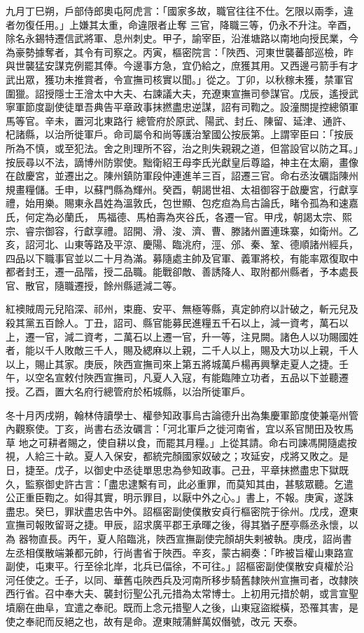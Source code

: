 \begin{pinyinscope}
 九月丁巳朔，戶部侍郎奧屯阿虎言：「國家多故，職官往往不仕。乞限以兩季，違者勿復任用。」上嫌其太重，命違限者止奪
 三官，降職三等，仍永不升注。辛酉，除名永錫特遷信武將軍、息州刺史。甲子，諭宰臣，沿淮塘路以南地向授民業，今為豪勢據奪者，其令有司察之。丙寅，樞密院言：「陜西、河東世襲蕃部巡檢，昨與世襲猛安謀克例罷其俸。今邊事方急，宜仍給之，庶獲其用。又西邊弓箭手有才武出眾，獲功未推賞者，令宣撫司核實以聞。」從之。丁卯，以秋稼未獲，禁軍官圍獵。詔授隱士王澮太中大夫、右諫議大夫，充遼東宣撫司參謀官。戊辰，遙授武寧軍節度副使徒單吾典告平章政事抹撚盡忠逆謀，詔有司鞫之。設潼關提控總領軍馬等官。辛未，置河北東路行
 總管府於原武、陽武、封丘、陳留、延津、通許、杞諸縣，以治所徙軍戶。命司屬令和尚等護治鞏國公按辰第。上謂宰臣曰：「按辰所為不慎，或至犯法。舍之則理所不容，治之則失親親之道，但當設官以防之耳。」按辰尋以不法，謫博州防禦使。黜衛紹王母李氏光獻皇后尊謚，神主在太廟，畫像在啟慶宮，並遷出之。陳州鎮防軍段仲連進羊三百，詔遷三官。命右丞汝礪詣陳州規畫糧儲。壬申，以蘇門縣為輝州。癸酉，朝謁世祖、太祖御容于啟慶宮，行獻享禮，始用樂。賜東永昌姓為溫敦氏，包世顯、包疙疸為烏古論氏，睹令孤為和速嘉氏，何定為必蘭氏，
 馬福德、馬柏壽為夾谷氏，各遷一官。甲戌，朝謁太宗、熙宗、睿宗御容，行獻享禮。詔開、滑、浚、濟、曹、滕諸州置連珠寨，如衛州。乙亥，詔河北、山東等路及平涼、慶陽、臨洮府，涇、邠、秦、鞏、德順諸州經兵，四品以下職事官並以二十月為滿。募隨處主帥及官軍、義軍將校，有能率眾復取中都者封王，遷一品階，授二品職。能戰卻敵、善誘降人、取附都州縣者，予本處長官、散官，隨職遷授，餘州縣遞減二等。



 紅襖賊周元兒陷深、祁州，束鹿、安平、無極等縣，真定帥府以計破之，斬元兒及殺其黨五百餘人。丁丑，詔司、縣官能募民進糧五千石以上，減一資考，萬石以
 上，遷一官，減二資考，二萬石以上遷一官，升一等，注見闕。諸色人以功賜國姓者，能以千人敗敵三千人，賜及緦麻以上親，二千人以上，賜及大功以上親，千人以上，賜止其家。庚辰，陜西宣撫司來上第五將城萬戶楊再興擊走夏人之捷。壬午，以空名宣敕付陜西宣撫司，凡夏人入寇，有能臨陣立功者，五品以下並聽遷授。乙酉，置大名府行總管府於柘城縣，以治所徙軍戶。



 冬十月丙戌朔，翰林侍讀學士、權參知政事烏古論德升出為集慶軍節度使兼亳州管內觀察使。丁亥，尚書右丞汝礪言：「河北軍戶之徙河南省，宜以系官閒田及牧馬草
 地之可耕者賜之，使自耕以食，而罷其月糧。」上從其請。命右司諫馮開隨處按視，人給三十畝。夏人入保安，都統完顏國家奴破之；攻延安，戍將又敗之。是日，捷至。戊子，以御史中丞徒單思忠為參知政事。己丑，平章抹撚盡忠下獄既久，監察御史許古言：「盡忠逮繫有司，此必重罪，而莫知其由，甚駭眾聽。乞遣公正重臣鞫之。如得其實，明示罪目，以厭中外之心。」書上，不報。庚寅，遂誅盡忠。癸巳，罪狀盡忠告中外。詔樞密副使僕散安貞行樞密院于徐州。戊戌，遼東宣撫司報敗留哥之捷。甲辰，詔求廣平郡王承暉之後，得其猶子歷亭縣丞永懷，以為
 器物直長。丙午，夏人陷臨洮，陜西宣撫副使完顏胡失剌被執。庚戌，詔尚書左丞相僕散端兼都元帥，行尚書省于陜西。辛亥，蒙古綱奏：「昨被旨權山東路宣副使，屯東平。行至徐北岸，北兵已偪徐，不可往。」詔樞密副使僕散安貞權於沿河任使之。壬子，以同、華舊屯陜西兵及河南所移步騎舊隸陜州宣撫司者，改隸陜西行省。召中奉大夫、襲封衍聖公孔元措為太常博士。上初用元措於朝，或言宣聖墳廟在曲阜，宜遣之奉祀。既而上念元措聖人之後，山東寇盜縱橫，恐罹其害，是使之奉祀而反絕之也，故有是命。遼東賊蒲鮮萬奴僭號，改元
 天泰。




\end{pinyinscope}
